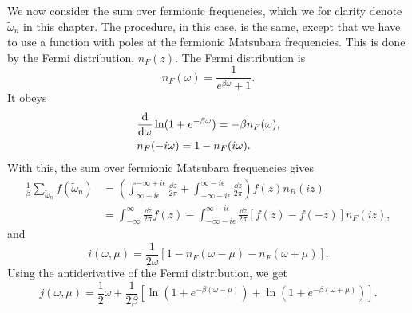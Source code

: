 We now consider the sum over fermionic frequencies, which we for clarity denote $\tilde \omega_n$ in this chapter.
The procedure, in this case, is the same, except that we have to use a function with poles at the fermionic Matsubara frequencies.
This is done by the Fermi distribution, $n_F(z)$.
The Fermi distribution is
%
\begin{equation}
    n_F(\omega) = \frac{1}{e^{\beta \omega} + 1}.
\end{equation}
%
It obeys
%
\begin{align}
    &\odv{}{\omega} \ln(1 + e^{-\beta \omega}) = - \beta n_F(\omega), \\
    & n_F(- i\omega) = 1 - n_F(i\omega).
\end{align}
%
With this, the sum over fermionic Matsubara frequencies gives
%
\begin{align}
    \nonumber
    \frac{1}{\beta} \sum_{\tilde \omega_n} f(\tilde \omega_n)
    & = \left(
        \int_{\infty + i \epsilon}^{-\infty + i \epsilon} \frac{\dd z}{2 \pi} 
        + \int_{-\infty - i \epsilon}^{\infty - i \epsilon}\frac{\dd z}{2 \pi}
    \right) 
    f(z) n_B(i z) \\
    & =
    \int_{-\infty}^{\infty} \frac{\dd z}{2 \pi} f(z)
    -
    \int_{-\infty - i \epsilon}^{\infty - i \epsilon}\frac{\dd z}{2 \pi}
    \left[
        f(z) - f(-z)
    \right]
    n_F(iz),
\end{align}
%
and 
%
\begin{equation}
    i(\omega, \mu) = \frac{1}{2 \omega} [1 - n_F(\omega - \mu) - n_F(\omega + \mu)].
\end{equation}
%
Using the antiderivative of the Fermi distribution, we get
%
\begin{equation}
    j(\omega, \mu) 
    = \frac{1}{2} \omega 
    + \frac{1}{2 \beta }
    \left[
        \ln\left(1 + e^{-\beta(\omega - \mu)}\right)
        + \ln\left(1 + e^{-\beta(\omega + \mu)}\right)
    \right].
\end{equation}

